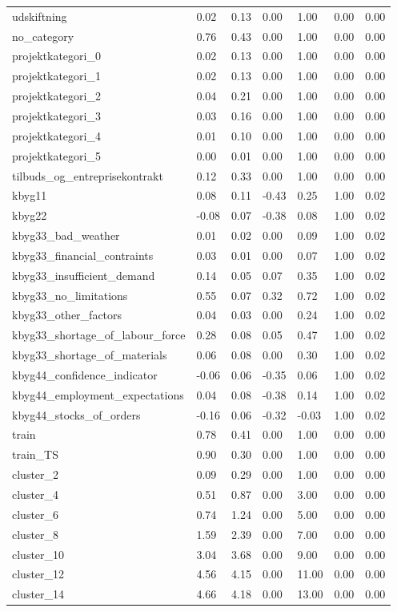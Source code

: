 \begin{landscape}
\begin{longtable}[h!]{lllllll}
udskiftning & 0.02 & 0.13 & 0.00 & 1.00 & 0.00 & 0.00 \\
no_category & 0.76 & 0.43 & 0.00 & 1.00 & 0.00 & 0.00 \\
projektkategori_0 & 0.02 & 0.13 & 0.00 & 1.00 & 0.00 & 0.00 \\
projektkategori_1 & 0.02 & 0.13 & 0.00 & 1.00 & 0.00 & 0.00 \\
projektkategori_2 & 0.04 & 0.21 & 0.00 & 1.00 & 0.00 & 0.00 \\
projektkategori_3 & 0.03 & 0.16 & 0.00 & 1.00 & 0.00 & 0.00 \\
projektkategori_4 & 0.01 & 0.10 & 0.00 & 1.00 & 0.00 & 0.00 \\
projektkategori_5 & 0.00 & 0.01 & 0.00 & 1.00 & 0.00 & 0.00 \\
tilbuds_og_entreprisekontrakt & 0.12 & 0.33 & 0.00 & 1.00 & 0.00 & 0.00 \\
kbyg11 & 0.08 & 0.11 & -0.43 & 0.25 & 1.00 & 0.02 \\
kbyg22 & -0.08 & 0.07 & -0.38 & 0.08 & 1.00 & 0.02 \\
kbyg33_bad_weather & 0.01 & 0.02 & 0.00 & 0.09 & 1.00 & 0.02 \\
kbyg33_financial_contraints & 0.03 & 0.01 & 0.00 & 0.07 & 1.00 & 0.02 \\
kbyg33_insufficient_demand & 0.14 & 0.05 & 0.07 & 0.35 & 1.00 & 0.02 \\
kbyg33_no_limitations & 0.55 & 0.07 & 0.32 & 0.72 & 1.00 & 0.02 \\
kbyg33_other_factors & 0.04 & 0.03 & 0.00 & 0.24 & 1.00 & 0.02 \\
kbyg33_shortage_of_labour_force & 0.28 & 0.08 & 0.05 & 0.47 & 1.00 & 0.02 \\
kbyg33_shortage_of_materials & 0.06 & 0.08 & 0.00 & 0.30 & 1.00 & 0.02 \\
kbyg44_confidence_indicator & -0.06 & 0.06 & -0.35 & 0.06 & 1.00 & 0.02 \\
kbyg44_employment_expectations & 0.04 & 0.08 & -0.38 & 0.14 & 1.00 & 0.02 \\
kbyg44_stocks_of_orders & -0.16 & 0.06 & -0.32 & -0.03 & 1.00 & 0.02 \\
train & 0.78 & 0.41 & 0.00 & 1.00 & 0.00 & 0.00 \\
train_TS & 0.90 & 0.30 & 0.00 & 1.00 & 0.00 & 0.00 \\
cluster_2 & 0.09 & 0.29 & 0.00 & 1.00 & 0.00 & 0.00 \\
cluster_4 & 0.51 & 0.87 & 0.00 & 3.00 & 0.00 & 0.00 \\
cluster_6 & 0.74 & 1.24 & 0.00 & 5.00 & 0.00 & 0.00 \\
cluster_8 & 1.59 & 2.39 & 0.00 & 7.00 & 0.00 & 0.00 \\
cluster_10 & 3.04 & 3.68 & 0.00 & 9.00 & 0.00 & 0.00 \\
cluster_12 & 4.56 & 4.15 & 0.00 & 11.00 & 0.00 & 0.00 \\
cluster_14 & 4.66 & 4.18 & 0.00 & 13.00 & 0.00 & 0.00 \\
\end{longtable}\end{landscape}
